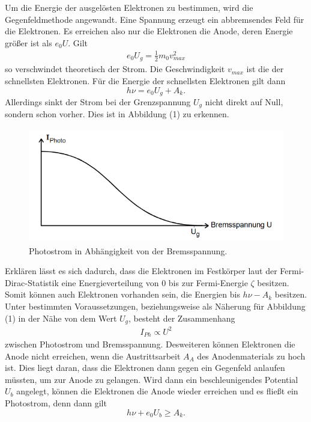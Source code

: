 Um die Energie der ausgelösten Elektronen zu bestimmen, wird die Gegenfeldmethode angewandt.
Eine Spannung erzeugt ein abbremsendes Feld für die Elektronen. Es erreichen also nur die Elektronen die Anode, deren Energie größer ist als $e_0 U$.
Gilt
\begin{align}
  e_0 U_g = \frac{1}{2} m_0 v_{max}^2
\end{align}
so verschwindet theoretisch der Strom. Die Geschwindigkeit $v_{max}$ ist die der schnellsten Elektronen.
Für die Energie der schnellsten Elektronen gilt dann
\begin{equation}
  h \nu = e_0 U_g  + A_k .
\end{equation}
Allerdings sinkt der Strom bei der Grenzspannung $U_g$ nicht direkt auf Null, sondern schon vorher. Dies ist in Abbildung (1) zu erkennen. 
\begin{figure}[H]
  \centering
  \includegraphics[height=5cm]{strom.PNG}
  \caption{Photostrom in Abhängigkeit von der Bremsspannung. \cite{kent}}
  \label{fig:kathode}
\end{figure}
Erklären lässt es sich dadurch, dass die Elektronen im Festkörper laut der Fermi-Dirac-Statistik eine Energieverteilung von $0$ bis zur Fermi-Energie $\zeta$ besitzen. Somit können auch Elektronen vorhanden sein, die Energien bis $h \nu - A_k$ besitzen. 
Unter bestimmten Voraussetzungen, beziehungsweise als Näherung für Abbildung (1) in der Nähe von dem Wert $U_g$, besteht der Zusammenhang
\begin{align*}
  I_{Ph} \propto U^2
\end{align*}
zwischen Photostrom und Bremsspannung.
Desweiteren können Elektronen die Anode nicht erreichen, wenn die Austrittsarbeit $A_A$ des Anodenmaterials zu hoch ist. Dies liegt daran, dass die Elektronen dann gegen ein Gegenfeld anlaufen müssten, um zur Anode zu gelangen. Wird dann ein beschleunigendes Potential $U_b$ angelegt, können die Elektronen die Anode wieder erreichen und es fließt ein Photostrom, denn dann gilt
\begin{equation}
  h \nu + e_0 U_b  \geq  A_k .
\end{equation}





